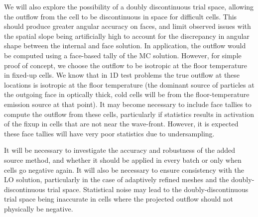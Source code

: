 \documentclass[11pt]{article}
\begin{document}
We will also explore the possibility of a doubly discontinuous trial space, allowing
the outflow from the cell to be discontinuous in space for difficult cells. This should produce greater
angular accuracy on faces, and limit observed issues with the spatial slope being
artificially high to account for the discrepancy in angular shape between the
internal and face solution. In application, the outflow would be computed using a
face-based tally of the MC solution.  However, for simple proof of concept, we choose
the outflow to be isotropic at the floor temperature in fixed-up cells.  We know
that in 1D test problems the true outflow at these locations is isotropic
at the floor temperature (the dominant source of particles at the outgoing face in
optically thick, cold cells will be from the floor-temperature emission source at
that point).  It may become necessary to include face tallies to
compute the outflow from these cells, particularly if statistics results in
activation of the fixup in cells that are not near the wave-front.  However, it is
expected these face tallies will have very poor statistics due to undersampling.

It will be necessary to investigate the accuracy and robustness of the
added source method, and whether it should be applied in every batch or only when cells
go negative again. It will also be necessary to ensure consistency with the LO
solution, particularly in the case of adaptively refined meshes and the
doubly-discontinuous trial space.  Statistical noise may lead to the
doubly-discontinuous trial space being inaccurate in cells where the projected
outflow should not physically be negative.
\end{document}
